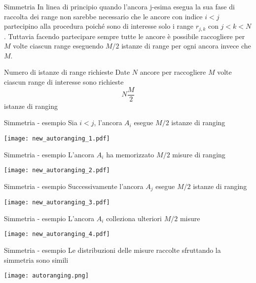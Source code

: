 \begin{frame}{Simmetria}
  In linea di principio quando l'ancora j-esima esegua la sua fase di raccolta dei range non sarebbe
  necessario che le ancore con indice $i < j$ partecipino alla procedura poiché sono di interesse solo
  i range $r_{j,k}$ con $j < k < N$. Tuttavia facendo partecipare sempre tutte le ancore è possibile
  raccogliere per $M$ volte ciascun range eseguendo $M/2$ istanze di range per ogni ancora invece che $M$.

  \begin{exampleblock}{Numero di istanze di range richieste}
    Date $N$ ancore per raccogliere $M$ volte ciascun range di interesse sono richieste
    \[
    N \frac{M}{2}
    \]
    istanze di ranging
  \end{exampleblock}
\end{frame}

\begin{frame}{Simmetria - esempio}
  Sia $i<j$, l'ancora $A_i$ esegue $M/2$ istanze di ranging
  \begin{center}
    \texttt{[image: new\_autoranging\_1.pdf]}
  \end{center}
\end{frame}

\begin{frame}{Simmetria - esempio}
  L'ancora $A_i$ ha memorizzato $M/2$ misure di ranging
  \begin{center}
    \texttt{[image: new\_autoranging\_2.pdf]}
  \end{center}
\end{frame}

\begin{frame}{Simmetria - esempio}
   Successivamente l'ancora $A_j$ esegue $M/2$ istanze di ranging
  \begin{center}
    \texttt{[image: new\_autoranging\_3.pdf]}
  \end{center}
\end{frame}

\begin{frame}{Simmetria - esempio}
  L'ancora $A_i$ colleziona ulteriori $M/2$ misure
  \begin{center}
    \texttt{[image: new\_autoranging\_4.pdf]}
  \end{center}
\end{frame}

\begin{frame}{Simmetria - esempio}
  Le distribuzioni delle misure raccolte sfruttando la simmetria sono simili 
  \begin{center}
    \texttt{[image: autoranging.png]}
  \end{center}
\end{frame}

